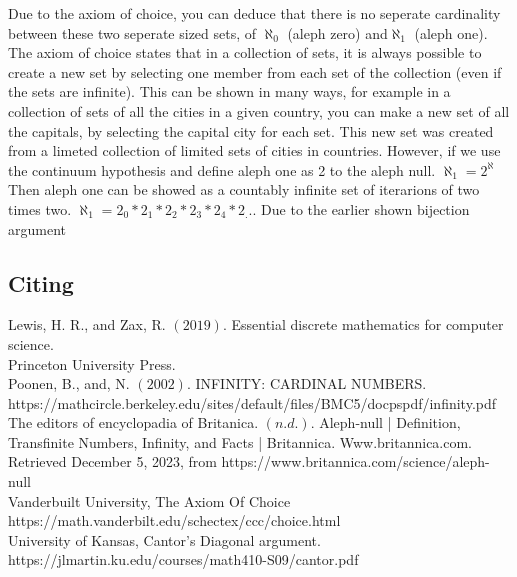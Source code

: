 \documentclass{article}
\begin{document}
\begin{large}
      Due to the axiom of choice, you can deduce that there is no seperate cardinality between these two seperate sized sets, of $ \aleph_0 $  (aleph zero) and$ \aleph_1 $ (aleph one).
The axiom of choice states that in a collection of sets,
it is always possible to create a new set by selecting one member from each set of the collection (even if the sets are infinite).
This can be shown in many ways, for example in a collection of sets of all the cities in  a given country, you can make a new set of all the capitals, by selecting the capital city for each set.
This new set was created from a limeted collection of limited sets of cities in countries.
However, if we use the continuum hypothesis and define aleph one as 2 to the aleph null.
$ \aleph_1 =  2^ \aleph $
Then aleph one can be showed as a countably infinite set of iterarions of two times two.
$ \aleph_1 = {2_0 *2_1 * 2_2 * 2_3 * 2_4 * 2_...}$
Due to the earlier shown bijection argument 

      

\end{large}
\newpage
\begin{Huge}
{\center \section{Citing}}
\end{Huge}
\begin{large}
  Lewis, H. R., and Zax, R. $ (2019) $. Essential discrete mathematics for computer science.
  \\
        Princeton University Press.
\\
Poonen, B., and, N. $ (2002) $. INFINITY: CARDINAL NUMBERS.
     https://mathcircle.berkeley.edu/sites/default/files/BMC5/docpspdf/infinity.pdf
\\
The editors of encyclopadia of Britanica. $ (n.d.) $. Aleph-null | Definition, Transfinite
       Numbers, Infinity, and Facts | Britannica. Www.britannica.com. Retrieved
       December 5, 2023, from https://www.britannica.com/science/aleph-null
       \\
       Vanderbuilt University, The Axiom Of Choice
       https://math.vanderbilt.edu/schectex/ccc/choice.html
       \\
University of Kansas, Cantor's Diagonal argument.
     https://jlmartin.ku.edu/courses/math410-S09/cantor.pdf
\\
     
\end{large}
\end{document}
